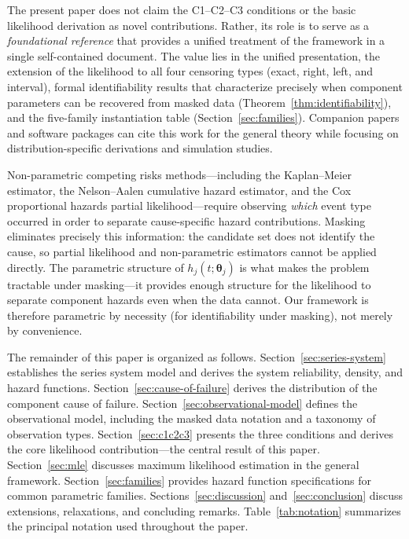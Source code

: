 \documentclass[11pt]{article}
\theoremstyle{definition}
\theoremstyle{plain}
\renewcommand{\v}[1]{\boldsymbol{#1}}
\begin{document}
The present paper does not claim the C1--C2--C3 conditions or the basic
likelihood derivation as novel contributions.
Rather, its role is to serve as a \emph{foundational reference} that
provides a unified treatment of the framework
in a single self-contained document.
The value lies in the unified presentation, the extension of the
likelihood to all four censoring types (exact, right, left, and
interval), formal identifiability results that characterize precisely
when component parameters can be recovered from masked data
(Theorem~\ref{thm:identifiability}), and the five-family
instantiation table (Section~\ref{sec:families}).
Companion papers and software packages can cite this work for the
general theory while focusing on distribution-specific derivations
and simulation studies.

Non-parametric competing risks methods---including the Kaplan--Meier
estimator, the Nelson--Aalen cumulative hazard estimator, and the
Cox proportional hazards partial likelihood---require observing
\emph{which} event type occurred in order to separate cause-specific
hazard contributions.
Masking eliminates precisely this information: the candidate set
does not identify the cause, so partial likelihood and non-parametric
estimators cannot be applied directly.
The parametric structure of $h_j(t; \v{\theta}_j)$ is what makes the
problem tractable under masking---it provides enough structure for
the likelihood to separate component hazards even when the data cannot.
Our framework is therefore parametric by necessity (for identifiability
under masking), not merely by convenience.

The remainder of this paper is organized as follows.
Section~\ref{sec:series-system} establishes the series system model and
derives the system reliability, density, and hazard functions.
Section~\ref{sec:cause-of-failure} derives the distribution of the
component cause of failure.
Section~\ref{sec:observational-model} defines the observational model,
including the masked data notation and a taxonomy of observation types.
Section~\ref{sec:c1c2c3} presents the three conditions and derives the
core likelihood contribution---the central result of this paper.
Section~\ref{sec:mle} discusses maximum likelihood estimation in the
general framework.
Section~\ref{sec:families} provides hazard function specifications for
common parametric families.
Sections~\ref{sec:discussion} and~\ref{sec:conclusion} discuss extensions,
relaxations, and concluding remarks.
Table~\ref{tab:notation} summarizes the principal notation used
throughout the paper.
\end{document}
